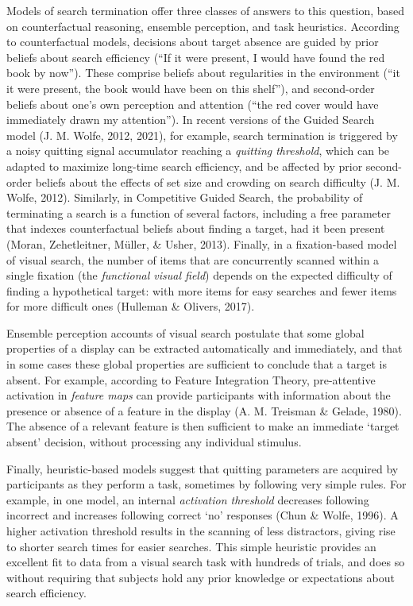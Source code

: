 \documentclass[12pt,twoside]{reedthesis}
\begin{document}
Models of search termination offer three classes of answers to this question, based on counterfactual reasoning, ensemble perception, and task heuristics. According to counterfactual models, decisions about target absence are guided by prior beliefs about search efficiency (``If it were present, I would have found the red book by now''). These comprise beliefs about regularities in the environment (``it it were present, the book would have been on this shelf''), and second-order beliefs about one's own perception and attention (``the red cover would have immediately drawn my attention''). In recent versions of the Guided Search model (J. M. Wolfe, 2012, 2021), for example, search termination is triggered by a noisy quitting signal accumulator reaching a \emph{quitting threshold}, which can be adapted to maximize long-time search efficiency, and be affected by prior second-order beliefs about the effects of set size and crowding on search difficulty (J. M. Wolfe, 2012). Similarly, in Competitive Guided Search, the probability of terminating a search is a function of several factors, including a free parameter that indexes counterfactual beliefs about finding a target, had it been present (Moran, Zehetleitner, Müller, \& Usher, 2013). Finally, in a fixation-based model of visual search, the number of items that are concurrently scanned within a single fixation (the \emph{functional visual field}) depends on the expected difficulty of finding a hypothetical target: with more items for easy searches and fewer items for more difficult ones (Hulleman \& Olivers, 2017).

Ensemble perception accounts of visual search postulate that some global properties of a display can be extracted automatically and immediately, and that in some cases these global properties are sufficient to conclude that a target is absent. For example, according to Feature Integration Theory, pre-attentive activation in \emph{feature maps} can provide participants with information about the presence or absence of a feature in the display (A. M. Treisman \& Gelade, 1980). The absence of a relevant feature is then sufficient to make an immediate `target absent' decision, without processing any individual stimulus.

Finally, heuristic-based models suggest that quitting parameters are acquired by participants as they perform a task, sometimes by following very simple rules. For example, in one model, an internal \emph{activation threshold} decreases following incorrect and increases following correct `no' responses (Chun \& Wolfe, 1996). A higher activation threshold results in the scanning of less distractors, giving rise to shorter search times for easier searches. This simple heuristic provides an excellent fit to data from a visual search task with hundreds of trials, and does so without requiring that subjects hold any prior knowledge or expectations about search efficiency.
\end{document}
